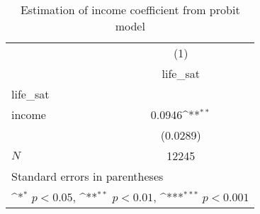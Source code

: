 \begin{table}[htbp]\centering
\def\sym#1{\ifmmode^{#1}\else\(^{#1}\)\fi}
\caption{Estimation of income coefficient from probit model}
\begin{tabular}{l*{1}{c}}
\hline\hline
            &\multicolumn{1}{c}{(1)}\\
            &\multicolumn{1}{c}{life\_sat}\\
\hline
life\_sat    &                     \\
income      &      0.0946\sym{**} \\
            &    (0.0289)         \\
\hline
\(N\)       &       12245         \\
\hline\hline
\multicolumn{2}{l}{\footnotesize Standard errors in parentheses}\\
\multicolumn{2}{l}{\footnotesize \sym{*} \(p<0.05\), \sym{**} \(p<0.01\), \sym{***} \(p<0.001\)}\\
\end{tabular}
\end{table}
